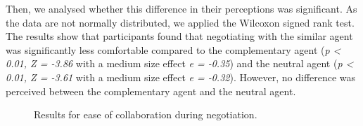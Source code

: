 \documentclass[10pt, a4paper, twocolumn]{article} %
\begin{document}
		Then, we analysed whether this difference in their perceptions was significant. As the data are not normally distributed, we applied the Wilcoxon signed rank test. The results show that participants found that negotiating with the similar agent was significantly less comfortable compared to the complementary agent (\emph{p < 0.01, Z = -3.86} with a medium size effect \emph{e = -0.35}) and the neutral agent (\emph{p < 0.01, Z = -3.61} with a medium size effect \emph{e = -0.32}).
		However, no difference was perceived between the complementary agent and the neutral agent.
		
			\begin{figure}[h]
			
			
			\caption{Results for ease of collaboration during negotiation.}
			\label{fig:aise}
		\end{figure}
	
	
\end{document}
